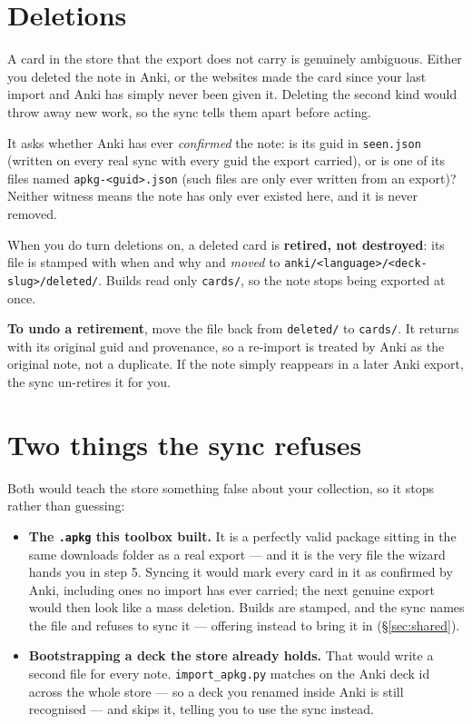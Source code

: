 \documentclass[11pt,oneside]{report}
\newcommand{\file}[1]{\texttt{#1}}
\begin{document}
\section{Deletions}
\label{sec:deletions}

A card in the store that the export does not carry is genuinely ambiguous.
Either you deleted the note in Anki, or the websites made the card since your
last import and Anki has simply never been given it. Deleting the second kind
would throw away new work, so the sync tells them apart before acting.

It asks whether Anki has ever \emph{confirmed} the note: is its guid in
\file{seen.json} (written on every real sync with every guid the export
carried), or is one of its files named \file{apkg-<guid>.json} (such files
are only ever written from an export)? Neither witness means the note has
only ever existed here, and it is never removed.

When you do turn deletions on, a deleted card is \textbf{retired, not
destroyed}: its file is stamped with when and why and \emph{moved} to
\file{anki/<language>/<deck-slug>/deleted/}. Builds read only \file{cards/},
so the note
stops being exported at once.

\begin{goodbox}
\textbf{To undo a retirement}, move the file back from \file{deleted/} to
\file{cards/}. It returns with its original guid and provenance, so a
re-import is treated by Anki as the original note, not a duplicate. If the
note simply reappears in a later Anki export, the sync un-retires it for you.
\end{goodbox}

\section{Two things the sync refuses}

Both would teach the store something false about your collection, so it
stops rather than guessing:

\begin{itemize}
\item \textbf{The \file{.apkg} this toolbox built.} It is a perfectly valid
  package sitting in the same downloads folder as a real export --- and it
  is the very file the wizard hands you in step 5. Syncing it would mark
  every card in it as confirmed by Anki, including ones no import has ever
  carried; the next genuine export would then look like a mass deletion.
  Builds are stamped, and the sync names the file and refuses to sync it
  --- offering instead to bring it in (\S\ref{sec:shared}).
\item \textbf{Bootstrapping a deck the store already holds.} That would
  write a second file for every note. \file{import\_apkg.py} matches on the
  Anki deck id across the whole store --- so a deck you renamed inside Anki
  is still recognised --- and skips it, telling you to use the sync instead.
\end{itemize}
\end{document}

